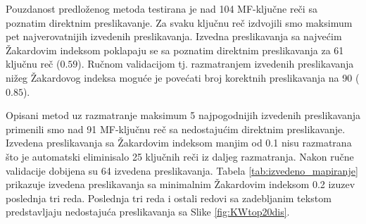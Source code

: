 Pouzdanost predloženog metoda testirana je nad 104 MF-ključne reči sa poznatim
direktnim preslikavanje.  Za svaku ključnu reč izdvojili smo maksimum pet
najverovatnijih izvedenih preslikavanja. Izvedna preslikavanja sa najvećim Žakardovim
indeksom poklapaju se sa poznatim direktnim preslikavanja za 61 ključnu reč
($0.59$). Ručnom validacijom tj. razmatranjem izvedenih preslikavanja nižeg
Žakardovog indeksa moguće je povećati broj korektnih preslikavanja na 90
($0.85$).

Opisani metod uz razmatranje maksimum 5 najpogodnijih izvedenih preslikavanja
primenili smo nad 91 MF-ključnu reč sa nedostajućim direktnim preslikavanje.
Izvedena preslikavanja sa Žakardovim indeksom manjim od 0.1 nisu razmatrana što je
automatski eliminisalo 25 ključnih reči iz daljeg razmatranja. Nakon ručne
validacije dobijena su 64 izvedena preslikavanja.  Tabela
\ref{tab:izvedeno_mapiranje} prikazuje izvedena preslikavanja sa minimalnim
Žakardovim indeksom 0.2 izuzev poslednja tri reda. Poslednja tri reda i
ostali redovi sa zadebljanim tekstom  predstavljaju nedostajuća
preslikavanja sa Slike \ref{fig:KWtop20dis}.


